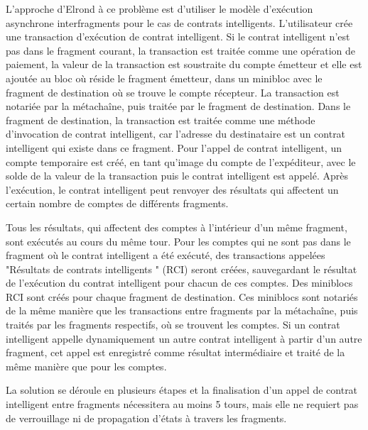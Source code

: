 \documentclass[journal]{IEEEtran}
\begin{document}
L'approche d'Elrond à ce problème est d'utiliser le modèle d'exécution asynchrone interfragments pour le cas de contrats intelligents. L'utilisateur crée une transaction d'exécution de contrat intelligent. Si le contrat intelligent n'est pas dans le fragment courant, la transaction est traitée comme une opération de paiement, la valeur de la transaction est soustraite du compte émetteur et elle est ajoutée au bloc où réside le fragment émetteur, dans un minibloc avec le fragment de destination où se trouve le compte récepteur. La transaction est notariée par la métachaîne, puis traitée par le fragment de destination. Dans le fragment de destination, la transaction est traitée comme une méthode d'invocation de contrat intelligent, car l'adresse du destinataire est un contrat intelligent qui existe dans ce fragment. Pour l'appel de contrat intelligent, un compte temporaire est créé, en tant qu'image du compte de l'expéditeur, avec le solde de la valeur de la transaction puis le contrat intelligent est appelé. Après l'exécution, le contrat intelligent peut renvoyer des résultats qui affectent un certain nombre de comptes de différents fragments.

Tous les résultats, qui affectent des comptes à l'intérieur d'un même fragment, sont exécutés au cours du même tour. Pour les comptes qui ne sont pas dans le fragment où le contrat intelligent a été exécuté, des transactions appelées "Résultats de contrats intelligents " (RCI) seront créées, sauvegardant le résultat de l'exécution du contrat intelligent pour chacun de ces comptes. Des miniblocs RCI  sont créés pour chaque fragment de destination. Ces miniblocs sont notariés de la même manière que les transactions entre fragments par la métachaîne, puis traités par les fragments respectifs, où se trouvent les comptes. Si un contrat intelligent appelle dynamiquement un autre contrat intelligent à partir d'un autre fragment, cet appel est enregistré comme résultat intermédiaire et traité de la même manière que pour les comptes.

La solution se déroule en plusieurs étapes et la finalisation d'un appel de contrat intelligent entre fragments nécessitera au moins 5 tours, mais elle ne requiert pas de verrouillage ni de propagation d'états à travers les fragments.


\end{document}
